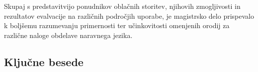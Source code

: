 Skupaj s predstavitvijo ponudnikov oblačnih storitev, njihovih zmogljivosti in rezultatov evalvacije na različnih področjih uporabe, je magistrsko delo prispevalo k boljšemu razumevanju primernosti ter učinkovitosti omenjenih orodij za različne naloge obdelave naravnega jezika.

\subsection*{Ključne besede}
\textit{\tkeywords}
\clearemptydoublepage 